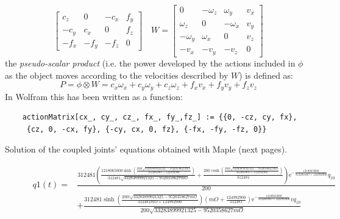 \documentclass[a4paper,12pt,oneside]{report}
\begin{document}
\begin{appendices}
\begin{equation}
\begin{bmatrix}
    c_z&0&-c_x&f_y\\
    -c_y&c_x&0&f_z\\
    -f_x&-f_y&-f_z&0
  \end{bmatrix} \quad W=\begin{bmatrix}
    0&-\omega_z&\omega_y&v_x\\
    \omega_z&0&-\omega_x&v_y\\
    -\omega_y&\omega_x&0&v_z\\
    -v_x&-v_y&-v_z&0
  \end{bmatrix}
\end{equation}
the \textit{pseudo-scalar product} (i.e. the power developed by the actions included in $\phi$ as the object moves according to the velocities described by $W$) is defined as:
\begin{equation}
  P=\phi\otimes W=c_x\omega_x+c_y\omega_y+c_z\omega_z+f_xv_x+f_yv_y+f_zv_z
  \label{pseudo_scalar}
\end{equation}
In Wolfram this has been written as a function:
\begin{small}
  \begin{verbatim}
    actionMatrix[cx_, cy_, cz_, fx_, fy_,fz_] := {{0, -cz, cy, fx},
     {cz, 0, -cx, fy}, {-cy, cx, 0, fz}, {-fx, -fy, -fz, 0}}
  \end{verbatim}
\end{small}
Solution of the coupled joints’ equations obtained with Maple (next pages).
    \begin{figure}
    \begin{scriptsize}
    \begin{equation}
      \begin{split}
      \mathit{q1} \! \left(t \right)=&\frac{312481 \left(\frac{1218065000 \sinh \left(\frac{200 t \sqrt{33283899921325-9520358627 \mathit{mO}}}{312481 \mathit{mO} +124992900}\right)}{312481 \sqrt{33283899921325-9520358627 \mathit{mO}}}+\frac{200 \cosh \left(\frac{200 t \sqrt{33283899921325-9520358627 \mathit{mO}}}{312481 \mathit{mO} +124992900}\right)}{312481}\right) {\mathrm e}^{-\frac{1218065000 t}{312481 \mathit{mO} +124992900}} q_{\mathit{10}}}{200}\\
      &+\frac{312481 \sinh \! \left(\frac{200 t \sqrt{33283899921325-9520358627 \mathit{mO}}}{312481 \mathit{mO} +124992900}\right) \left(\mathit{mO} +\frac{124992900}{312481}\right) {\mathrm e}^{-\frac{1218065000 t}{312481 \mathit{mO} +124992900}} \mathit{vq}_{\mathit{10}}}{200 \sqrt{33283899921325-9520358627 \mathit{mO}}}
      \end{split}

\end{equation}
\end{scriptsize}
\end{figure}
\end{appendices}
\end{document}
